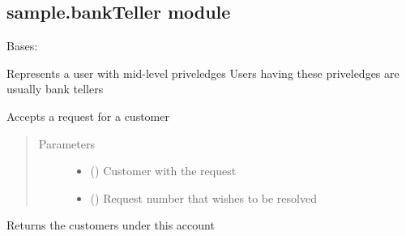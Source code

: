 \documentclass[letterpaper,10pt,english]{sphinxmanual}
\begin{document}
\subsection{sample.bankTeller module}
\label{\detokenize{sample:sample-bankteller-module}}\label{\detokenize{sample:module-sample.bankTeller}}

\begin{fulllineitems}
\label{\detokenize{sample:sample.bankTeller.BankTeller}}
Bases: 

Represents a user with mid-level priveledges
Users having these priveledges are usually bank tellers

\begin{fulllineitems}
\label{\detokenize{sample:sample.bankTeller.BankTeller.acceptRequest}}
Accepts a request for a customer
\begin{quote}\begin{description}
\item[{Parameters}] \leavevmode\begin{itemize}
\item {} 
 ({\hyperref[\detokenize{sample:sample.customer.Customer}]{}}) \textendash{} Customer with the request

\item {} 
 () \textendash{} Request number that wishes to be resolved

\end{itemize}

\end{description}\end{quote}

\end{fulllineitems}


\begin{fulllineitems}
\label{\detokenize{sample:sample.bankTeller.BankTeller.viewCustomers}}
Returns the customers under this account


\end{fulllineitems}
\end{fulllineitems}
\end{document}
